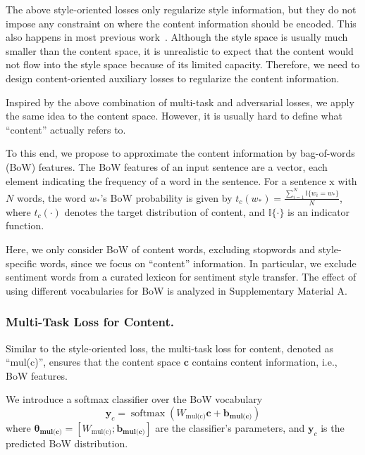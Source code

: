 \documentclass[letterpaper]{article} %
\newcommand{\rmx}{\mathrm x}
\newcommand{\nnweight}[1]{\bm{\theta_{\text{#1}}}}
\newcommand{\weight}[1]{W_{\text{#1}}}
\newcommand{\bias}[1]{\bm{b_{\text{#1}}}}
\begin{document}
The above style-oriented losses only regularize style information, but they do not impose any constraint on where the content information should be encoded. This also happens in most previous work~\cite{hu2017toward,shen2017style,fu2018style}.
Although the style space is usually much smaller than the content space, it is unrealistic to expect that the content would not flow into the style space because of its limited capacity. Therefore, we need to design content-oriented auxiliary losses to regularize the content information.

Inspired by the above combination of multi-task and adversarial losses, we apply the same idea to the content space. However, it is usually hard to define what ``content'' actually refers to.

To this end, we propose to approximate the content information by bag-of-words (BoW) features.
The BoW features of an input sentence  are a vector, each element indicating the frequency of a word in the sentence.
For a sentence $\rmx$ with $N$ words, the word $w_*$'s BoW probability is given by
$t_c(w_*)=\frac{\sum_{i=1}^{N}{\mathbb{I}\{w_i = w_*\}}}{N}$,
where $t_c(\cdot)$ denotes the target distribution of content, and $\mathbb{I\{\cdot\}}$ is an indicator function.

Here, we only consider BoW of content words, excluding stopwords and style-specific words, since we focus on ``content'' information. In particular, we exclude sentiment words from a curated lexicon \cite{hu2004mining} for sentiment style transfer.
The effect of using different vocabularies for BoW is analyzed in Supplementary Material A.

\subsubsection{Multi-Task Loss for Content.} \label{ssec:multitask-content-objective}

Similar to the style-oriented loss, the multi-task loss for content, denoted as ``mul(c)'', ensures that the content space $\bm c$ contains content information, i.e., BoW features.

We introduce a softmax classifier over the BoW vocabulary
\begin{equation} \label{eqn:bow-pred}
	\bm y_c = \operatorname{softmax}({\weight{mul(c)}} \bm c + \bias{mul(c)})
\end{equation}
where $\nnweight{mul(c)}=[\weight{mul(c)}; \bias{mul(c)}]$ are the classifier's parameters, and $\bm y_c$ is the predicted BoW distribution.
\end{document}
